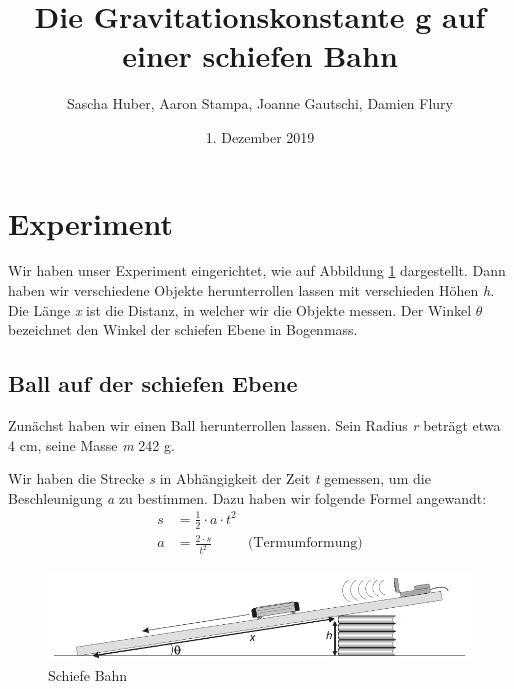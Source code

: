 \documentclass[a4paper, titlepage]{article}
\title{Die Gravitationskonstante g
auf einer schiefen Bahn}
\author{Sascha Huber, Aaron Stampa, Joanne Gautschi, Damien Flury}
\date{1. Dezember 2019}
\begin{document}
    \maketitle
    \tableofcontents
    \newpage
    \section{Experiment}
    Wir haben unser Experiment eingerichtet, wie auf Abbildung
    \ref{incline} dargestellt. Dann haben wir verschiedene Objekte
    herunterrollen lassen mit verschieden Höhen
    \emph{h}. Die Länge \emph{x} ist die Distanz, in welcher
    wir die Objekte messen. Der Winkel $\theta$ bezeichnet
    den Winkel der schiefen Ebene in Bogenmass.

    \subsection{Ball auf der schiefen Ebene}
    Zunächst haben wir einen Ball herunterrollen lassen.
    Sein Radius \emph{r} beträgt etwa 4 cm, seine Masse
    \emph{m} 242 g.
    
    Wir haben die Strecke \emph{s} in Abhängigkeit
    der Zeit \emph{t} gemessen, um die Beschleunigung
    \emph{a} zu bestimmen. Dazu haben wir folgende Formel
    angewandt:
    \begin{align}
        s &= \frac{1}{2} \cdot a \cdot t^2 \\
        a &= \frac{2 \cdot s}{t^2} &\text{(Termumformung)}
    \end{align}


    \begin{figure}
        \includegraphics[width=\textwidth]{images/incline.png}
        \caption{Schiefe Bahn}
        \label{incline}
    \end{figure}
\end{document}
